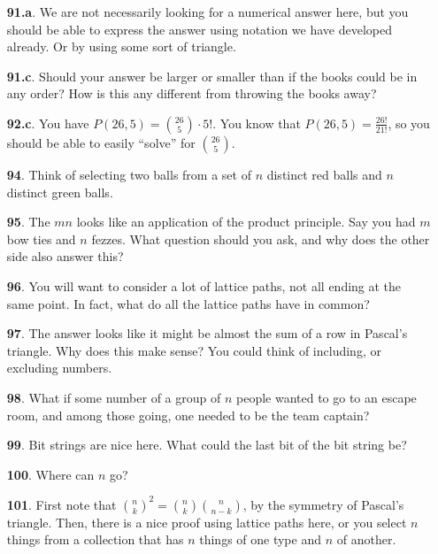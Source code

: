 \documentclass[10pt,]{book}
\theoremstyle{plain}
\theoremstyle{definition}
\theoremstyle{definition}
\theoremstyle{definition}
\numberwithin{equation}{chapter}
\begin{document}
\begin{itemize}[itemsep=1em]
\item[\textbf{91.a}.]\hypertarget{p-660}{}%
We are not necessarily looking for a numerical answer here, but you should be able to express the answer using notation we have developed already.  Or by using some sort of triangle.%

\item[\textbf{91.c}.]\hypertarget{p-663}{}%
Should your answer be larger or smaller than if the books could be in any order?  How is this any different from throwing the books away?%

\item[\textbf{92.c}.]\hypertarget{p-670}{}%
You have \(P(26,5) = \binom{26}{5}\cdot 5!\).  You know that \(P(26,5) = \frac{26!}{21!}\), so you should be able to easily ``solve'' for \(\binom{26}{5}\).%

\item[\textbf{94}.]\hypertarget{p-677}{}%
Think of selecting two balls from a set of \(n\) distinct red balls and \(n\) distinct green balls.%

\item[\textbf{95}.]\hypertarget{p-682}{}%
The \(mn\) looks like an application of the product principle.  Say you had \(m\) bow ties and \(n\) fezzes.  What question should you ask, and why does the other side also answer this?%

\item[\textbf{96}.]\hypertarget{p-686}{}%
You will want to consider a lot of lattice paths, not all ending at the same point.  In fact, what do all the lattice paths have in common?%

\item[\textbf{97}.]\hypertarget{p-690}{}%
The answer looks like it might be almost the sum of a row in Pascal's triangle.  Why does this make sense?  You could think of including, or excluding numbers.%

\item[\textbf{98}.]\hypertarget{p-695}{}%
What if some number of a group of \(n\) people wanted to go to an escape room, and among those going, one needed to be the team captain?%

\item[\textbf{99}.]\hypertarget{p-699}{}%
Bit strings are nice here.  What could the last bit of the bit string be?%

\item[\textbf{100}.]\hypertarget{p-704}{}%
Where can \(n\) go?%

\item[\textbf{101}.]\hypertarget{p-709}{}%
First note that \(\binom{n}{k}^2 = \binom{n}{k}\binom{n}{n-k}\), by the symmetry of Pascal's triangle.  Then, there is a nice proof using lattice paths here, or you select \(n\) things from a collection that has \(n\) things of one type and \(n\) of another.%


\end{itemize}
\end{document}
